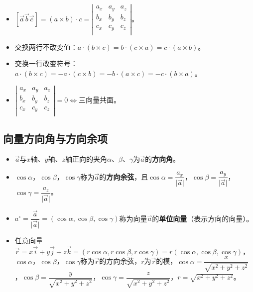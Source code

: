 \documentclass[UTF8, 12pt]{ctexart}
\begin{document}
        \begin{itemize}
            \item $[\vec{a}\vec{b}\vec{c}]=(a\times b)\cdot c=\left\vert\begin{array}{ccc}
                                                                            a_x & a_y & a_z \\
                                                                            b_x & b_y & b_z \\
                                                                            c_x & c_y & c_z \\
            \end{array}\right\vert$。
            \item 交换两行不改变值：$a\cdot(b\times c)=b\cdot(c\times a)=c\cdot(a\times b)$。
            \item 交换一行改变符号：$a\cdot(b\times c)=-a\cdot(c\times b)=-b\cdot(a\times c)=-c\cdot(b\times a)$。
            \item $\left\vert\begin{array}{ccc}
                                 a_x & a_y & a_z \\
                                 b_x & b_y & b_z \\
                                 c_x & c_y & c_z \\
            \end{array}\right\vert=0\Leftrightarrow$三向量共面。
        \end{itemize}

        \subsection{向量方向角与方向余项}

        \begin{itemize}
            \item $\vec{a}$与$x$轴、$y$轴、$z$轴正向的夹角$\alpha$、$\beta$、$\gamma$为$\vec{a}$的\textbf{方向角}。
            \item $\cos\alpha$，$\cos\beta$，$\cos\gamma$称为$\vec{a}$的\textbf{方向余弦}，且$\cos\alpha=\dfrac{a_x}{\vert\vec{a}\vert}$，$\cos\beta=\dfrac{a_y}{\vert\vec{a}\vert}$，$\cos\gamma=\dfrac{a_z}{\vert\vec{a}\vert}$。
            \item $a^\circ=\dfrac{\vec{a}}{\vert\vec{a}\vert}=(\cos\alpha,\cos\beta,\cos\gamma)$称为向量$\vec{a}$的\textbf{单位向量}（表示方向的向量）。
            \item 任意向量$\vec{r}=x\vec{i}+y\vec{j}+z\vec{k}=(r\cos\alpha,r\cos\beta,r\cos\gamma)=r(\cos\alpha,\cos\beta,\cos\gamma)$，$\cos\alpha$，$\cos\beta$，$\cos\gamma$称为$\vec{r}$的方向余弦，$r$为$\vec{r}$的模，$\cos\alpha=\dfrac{x}{\sqrt{x^2+y^2+z^2}}$，$\cos\beta=\dfrac{y}{\sqrt{x^2+y^2+z^2}}$，$\cos\gamma=\dfrac{z}{\sqrt{x^2+y^2+z^2}}$，$r=\sqrt{x^2+y^2+z^2}$。
        \end{itemize}
\end{document}
